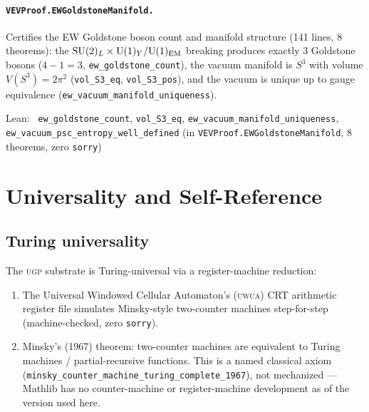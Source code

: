 \documentclass[11pt,a4paper]{article}
\newenvironment{leanref}%
  {\par\smallskip\noindent\begingroup\raggedright\textup{Lean:}~}%
  {\par\endgroup}
\theoremstyle{definition}
\newcommand{\ugp}{\textsc{ugp}}
\newcommand{\uwca}{\textsc{uwca}}
\begin{document}
\paragraph{\texttt{VEVProof.EWGoldstoneManifold.}}
Certifies the EW Goldstone boson count and manifold structure (141 lines, 8 theorems):
the $\mathrm{SU}(2)_L \times \mathrm{U}(1)_Y / \mathrm{U}(1)_{\rm EM}$ breaking produces
exactly 3 Goldstone bosons ($4 - 1 = 3$, \lstinline|ew_goldstone_count|),
the vacuum manifold is $S^3$ with volume $V(S^3) = 2\pi^2$
(\lstinline|vol_S3_eq|, \lstinline|vol_S3_pos|), and the vacuum is unique up to
gauge equivalence (\lstinline|ew_vacuum_manifold_uniqueness|).

\begin{leanref}
\lstinline|ew_goldstone_count|, \lstinline|vol_S3_eq|,
\lstinline|ew_vacuum_manifold_uniqueness|, \lstinline|ew_vacuum_psc_entropy_well_defined|
\textup{(in \texttt{VEVProof.EWGoldstoneManifold}, 8 theorems, zero \texttt{sorry})}
\end{leanref}

\section{Universality and Self-Reference}\label{sec:universality}

\subsection{Turing universality}

The \ugp{} substrate is Turing-universal via a register-machine reduction:

\begin{enumerate}[nosep]
\item The Universal Windowed Cellular Automaton's (\uwca{}) CRT arithmetic register
  file simulates Minsky-style two-counter machines step-for-step (machine-checked,
  zero \texttt{sorry}).
\item Minsky's (1967) theorem: two-counter machines are equivalent to Turing
  machines / partial-recursive functions.  This is a named classical axiom
  (\lstinline|minsky_counter_machine_turing_complete_1967|), not mechanized ---
  Mathlib has no counter-machine or register-machine development as of the
  version used here.
\end{enumerate}
\end{document}
